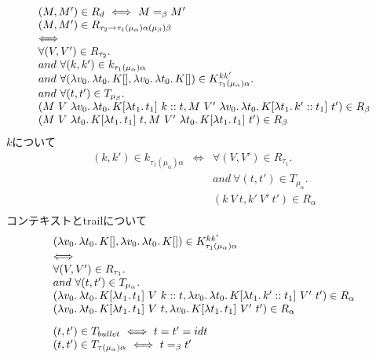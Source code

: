 \[
\begin{array}{l}
  (M, M')\in R_d \ \Longleftrightarrow\ M =_{\beta}M'\\
  (M, M')\in R_{\tau_2 \rightarrow \tau_1 (\mu_{\alpha}) \alpha (\mu_{\beta})\beta}\\
  \Longleftrightarrow\\
  \forall (V, V')\in R_{\tau_2}.\\
  and\ \forall (k,k')\in k_{\tau_1(\mu_{\alpha})\alpha}\\
  and\ \forall (\Lam{v_0}{\Lam{t_0}{K[]}}, \Lam{v_0}{\Lam{t_0}{K[]}})\in  K^{kk'}_{\tau_1(\mu_{\alpha})\alpha}.\\
  and\  \forall (t, t')\in T_{\mu_{\beta}}.\\
  (M\ V \ \Lam{v_0}{\Lam{t_0}{K[\Lam{t_1}{t_1}]}}\ \Cons{k}{t}, M\ V' \ \Lam{v_0}{\Lam{t_0}{K[\Lam{t_1}{\Cons{k'}{t_1}}]}}\ t')\in R_{\beta}\\
  (M\ V \ \Lam{t_0}{K[\Lam{t_1}{t_1}]}\ t, M\ V' \ \Lam{t_0}{K[\Lam{t_1}{t_1}]}\ t')\in R_{\beta}\\
\end{array}
\]
$k$について\\
\[
\begin{array}{lcl}
  (k,k')\in k_{\tau_1(\mu_{\alpha})\alpha} &\Longleftrightarrow&
  \forall (V, V')\in R_{\tau_1}.\\
  & & and\ \forall (t, t')\in T_{\mu_{\alpha}}.\\
  & & (k\ V\ t, k'\ V'\ t')\in R_{\alpha}\\
\end{array}
\]
コンテキストとtrailについて
\[
\begin{array}{l}
  (\Lam{v_0}{\Lam{t_0}{K[]}}, \Lam{v_0}{\Lam{t_0}{K[]}}) \in K^{kk'}_{\tau_1(\mu_{\alpha})\alpha}\\
  \Longleftrightarrow\\
  \forall (V, V')\in R_{\tau_1}.\\
  and\ \forall (t, t')\in T_{\mu_{\alpha}}.\\
  (\Lam{v_0}{\Lam{t_0}{K[\Lam{t_1}{t_1}]}}\ V\ \Cons{k}{t}, \Lam{v_0}{\Lam{t_0}{K[\Lam{t_1}{\Cons{k'}{t_1}}]}}\ V'\ t')\in R_{\alpha}\\
  (\Lam{v_0}{\Lam{t_0}{K[\Lam{t_1}{t_1}]}}\ V\ t, \Lam{v_0}{K[\Lam{t_1}{t_1}]}\ V'\ t')\in R_{\alpha}\\
[3mm]
  (t, t')\in T_{bullet}\ \Longleftrightarrow\  t=t'=idt\\
  (t, t')\in T_{\tau(\mu_{\alpha})\alpha}\ \Longleftrightarrow\ t=_{\beta}t'\\
\end{array}
\]
